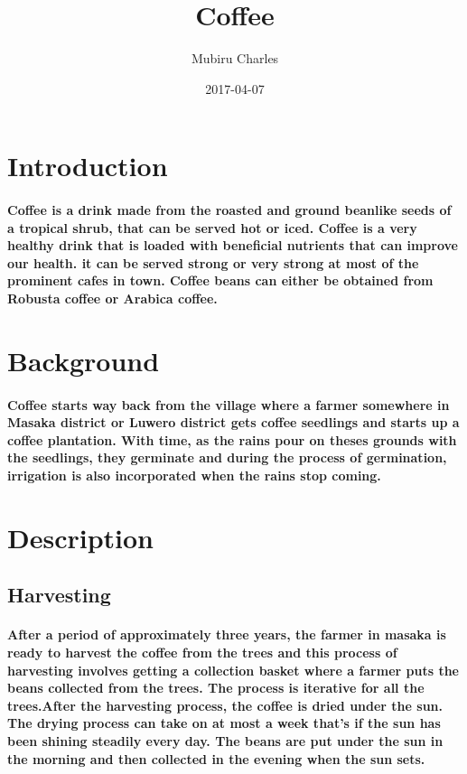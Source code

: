 \documentclass[12pt]{report}
\title{Coffee}
\author{Mubiru Charles}
\date{2017-04-07}
\begin{document}
\maketitle

\section{Introduction}
\paragraph{Coffee is a drink made from the roasted and ground beanlike seeds of a tropical shrub, that can be served hot or iced. Coffee is a very healthy drink that is loaded with beneficial nutrients that can improve our health. it can be served strong or very strong at most of the prominent cafes in town. Coffee beans can either be obtained from Robusta coffee or Arabica coffee.}

\section{Background}
\paragraph{Coffee starts way back from the village where a farmer somewhere in Masaka district or Luwero district gets coffee seedlings and starts up a coffee plantation. With time, as the rains pour on theses grounds with the seedlings, they germinate and during the process of germination, irrigation is also incorporated when the rains stop coming.}

\section{Description}
\subsection{Harvesting}
\paragraph{After a period of approximately three years, the farmer in masaka is ready to harvest the coffee from the trees and this process of harvesting involves getting a collection basket where a farmer puts the beans collected from the trees. The process is iterative for all the trees.After the harvesting process, the coffee is dried under the sun. The drying process can take on at most a week that’s if the sun has been shining steadily every day. The beans are put under the sun in the morning and then collected in the evening when the sun sets.}
\end{document}

